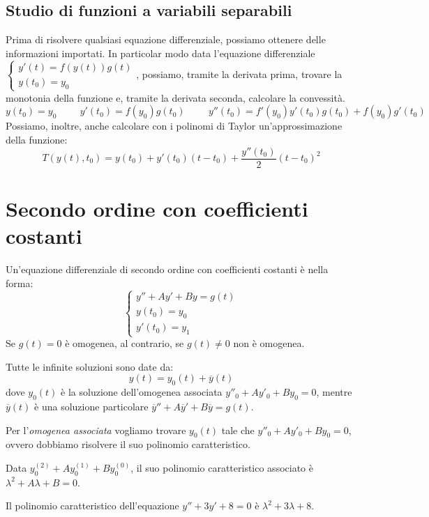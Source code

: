 \subsection*{Studio di funzioni a variabili separabili}
Prima di risolvere qualsiasi equazione differenziale, possiamo ottenere delle informazioni importati. In particolar modo data l'equazione differenziale $\begin{cases}y'(t)=f(y(t))g(t)\\y(t_0)=y_0\end{cases}$, possiamo, tramite la derivata prima, trovare la monotonia della funzione e, tramite la derivata seconda, calcolare la convessità.
\begin{equation*}y(t_0)=y_0\hspace{1cm}y'(t_0)=f(y_0)g(t_0)\hspace{1cm}y''(t_0)=f'(y_0)y'(t_0)g(t_0)+f(y_0)g'(t_0)\end{equation*}
Possiamo, inoltre, anche calcolare con i polinomi di Taylor un'approssimazione della funzione:
\begin{equation*}T(y(t),t_0)=y(t_0)+y'(t_0)(t-t_0)+\frac{y''(t_0)}{2}(t-t_0)^2\end{equation*}

\section{Secondo ordine con coefficienti costanti}
Un'equazione differenziale di secondo ordine con coefficienti costanti è nella forma:
\begin{equation*}\begin{cases}y''+Ay'+By=g(t)\\y(t_0)=y_0\\y'(t_0)=y_1\end{cases}\end{equation*}
Se $g(t)=0$ è omogenea, al contrario, se $g(t)\neq0$ non è omogenea.

Tutte le infinite soluzioni sono date da:
\begin{equation*}
    y(t)=y_0(t)+\overline{y}(t)    
\end{equation*}
dove $y_0(t)$ è la soluzione dell'omogenea associata $y''_0+Ay'_0+By_0=0$, mentre $\overline{y}(t)$ è una soluzione particolare $\overline{y}''+A\overline{y}'+B\overline{y}=g(t)$.

Per l'\textit{omogenea associata} vogliamo trovare $y_0(t)$ tale che $y''_0+Ay'_0+By_0=0$, ovvero dobbiamo risolvere il suo polinomio caratteristico.
\begin{definition*}
    Data $y_0^{(2)}+Ay_0^{(1)}+By_0^{(0)}$, il suo polinomio caratteristico associato è $\lambda^2+A\lambda+B=0$.
    \begin{example}
        Il polinomio caratteristico dell'equazione $y''+3y'+8=0$ è $\lambda^2+3\lambda+8$.
    \end{example}
\end{definition*}

